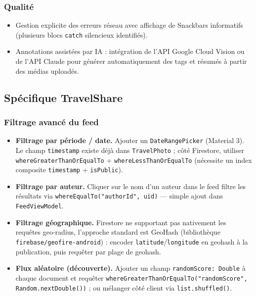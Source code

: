 \documentclass[a4paper, 12pt]{article}
\begin{document}
\begin{justify}
\subsubsection*{Qualité}

\begin{itemize}
    \item Gestion explicite des erreurs réseau avec affichage de Snackbars informatifs (plusieurs blocs \texttt{catch} silencieux identifiés).
    \item Annotations assistées par IA : intégration de l'API Google Cloud Vision ou de l'API Claude pour générer automatiquement des tags et résumés à partir des médias uploadés.
\end{itemize}


\subsection*{Spécifique TravelShare}

\subsubsection*{Filtrage avancé du feed}

\begin{itemize}
    \item \textbf{Filtrage par période / date.} Ajouter un \texttt{DateRangePicker} (Material 3). Le champ \texttt{timestamp} existe déjà dans \texttt{TravelPhoto} ; côté Firestore, utiliser \texttt{whereGreaterThanOrEqualTo} + \texttt{whereLessThanOrEqualTo} (nécessite un index composite \texttt{timestamp} + \texttt{isPublic}).
    \item \textbf{Filtrage par auteur.} Cliquer sur le nom d'un auteur dans le feed filtre les résultats via \texttt{whereEqualTo("authorId", uid)} — simple ajout dans \texttt{FeedViewModel}.
    \item \textbf{Filtrage géographique.} Firestore ne supportant pas nativement les requêtes geo-radius, l'approche standard est GeoHash (bibliothèque \texttt{firebase/\allowbreak{}geofire-android}) : encoder \texttt{latitude}/\texttt{longitude} en geohash à la publication, puis requêter par plage de geohash.
    \item \textbf{Flux aléatoire (découverte).} Ajouter un champ \texttt{randomScore:\allowbreak{} Double} à chaque document et requêter \texttt{whereGreaterThanOrEqualTo("randomScore", Random.\allowbreak{}nextDouble())} ; ou mélanger côté client via \texttt{list.\allowbreak{}shuffled()}.
\end{itemize}


\end{justify}
\end{document}
